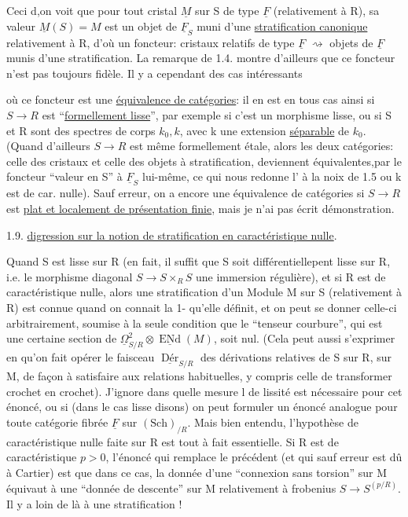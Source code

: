 Ceci d,on voit que pour tout cristal $\underline M$ sur S de type $\underline F$ (relativement à R), sa  valeur $\underline M(S)=M$ est un objet de $\underline F_S$ muni d'une \uline{stratification canonique} relativement à R, d'où un foncteur: cristaux relatifs de type $\underline F$ $\rightsquigarrow$ objets de $\underline F$ munis d'une stratification. La remarque de 1.4. montre d'ailleurs que ce foncteur n'est pas toujours fidèle. Il y a cependant des cas intéressants



où ce foncteur est une \uline{équivalence de catégories}: il en est en tous cas ainsi si $S\longrightarrow R$ est ``\uline{formellement lisse}'', par exemple si c'est un morphisme lisse, ou si S et R sont des spectres de corps $k_0,k$, avec k une extension \uline{séparable} de $k_0$. (Quand d'ailleurs $S\to R$ est même formellement étale, alors les deux catégories: celle des cristaux et celle des objets à stratification, deviennent  équivalentes,par le foncteur ``valeur en S''\inserted{,} à $\underline F_S$ lui-même, ce qui nous redonne l' à la noix de 1.5 ou k est de car. nulle). Sauf erreur, on a encore une équivalence de catégories si $S\to R$ est \uline{plat et localement de présentation finie},  mais je n'ai pas écrit  démonstration.

1.9. \uline{ digression sur la notion de stratification en caractéristique nulle}.

Quand S est lisse sur R (en fait, il suffit que S soit différentiellepent lisse sur R, i.e. le morphisme diagonal $S\to S\times_RS$ une immersion régulière), et si R est de caractéristique nulle, alors une stratification d'un Module M sur S (relativement à R) est connue quand on connait la 1- qu'elle définit, et on peut se donner celle-ci arbitrairement, soumise à la seule condition que le ``tenseur courbure'', qui est une certaine section de $\underline\Omega^2_{S/R}\otimes\underline{\operatorname{ENd}}(M)$, soit nul. (Cela peut aussi s'exprimer en  qu'on fait opérer le faisceau $\underline{\operatorname{Dér}}_{S/R}$ des dérivations relatives de S sur R, sur M, de façon à satisfaire aux relations habituelles, y compris celle de transformer crochet en crochet). J'ignore dans quelle mesure l  de lissité est nécessaire pour cet énoncé, ou si (dans le cas lisse disons) on peut formuler un énoncé analogue pour toute catégorie fibrée $\underline F$ sur $(\mathrm{Sch})_{/R}$. Mais bien entendu, l'hypothèse de caractéristique nulle faite sur R est tout à fait essentielle. Si R est de caractéristique $p>0$, l'énoncé qui remplace le précédent (et qui sauf erreur est dû à Cartier) est que dans ce cas, la donnée d'une ``connexion sans torsion'' sur M  équivaut à une ``donnée de descente'' sur M relativement à frobenius $S\longrightarrow S^{(p/R)}$. Il y a loin de là à une  stratification !

